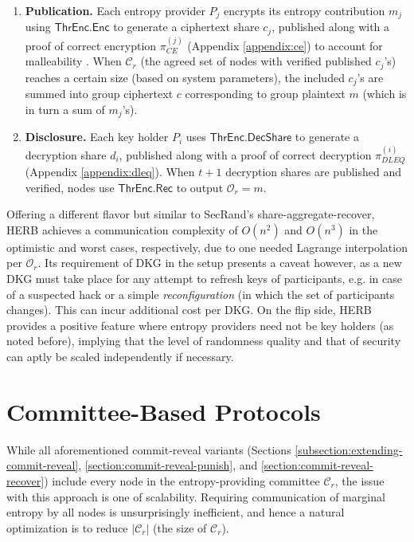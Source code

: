 \documentclass[conference]{IEEEtran}
\theoremstyle{definition}
\theoremstyle{remark}
\begin{document}
\begin{enumerate}
    \item \textbf{Publication.} Each entropy provider $P_j$ encrypts its entropy contribution $m_j$ using $\mathsf{ThrEnc.Enc}$ to generate a ciphertext share $c_j$, published along with a proof of correct encryption $\pi_{CE}^{(j)}$ (Appendix \ref{appendix:ce}) to account for malleability \cite{dolev2003nonmalleable}. When $\mathcal{C}_r$ (the agreed set of nodes with verified published $c_j$'s) reaches a certain size (based on system parameters), the included $c_j$'s are summed into group ciphertext $c$ corresponding to group plaintext $m$ (which is in turn a sum of $m_j$'s).
    \item \textbf{Disclosure.} Each key holder $P_i$ uses $\mathsf{ThrEnc.DecShare}$ to generate a decryption share $d_i$, published along with a proof of correct decryption $\pi_{DLEQ}^{(i)}$ (Appendix \ref{appendix:dleq}). When $t + 1$ decryption shares are published and verified, nodes use $\mathsf{ThrEnc.Rec}$ to output $\mathcal{O}_r = m$.
\end{enumerate}

Offering a different flavor but similar to SecRand's share-aggregate-recover, HERB achieves a communication complexity of $O(n^2)$ and $O(n^3)$ in the optimistic and worst cases, respectively, due to one needed Lagrange interpolation per $\mathcal{O}_r$. Its requirement of DKG in the setup presents a caveat however, as a new DKG must take place for any attempt to refresh keys of participants, e.g. in case of a suspected hack or a simple \textit{reconfiguration} (in which the set of participants changes). This can incur additional cost per DKG. On the flip side, HERB provides a positive feature where entropy providers need not be key holders (as noted before), implying that the level of randomness quality and that of security can aptly be scaled independently if necessary.

\section{Committee-Based Protocols}
\label{section:committee-based}
While all aforementioned commit-reveal variants (Sections \ref{subsection:extending-commit-reveal}, \ref{section:commit-reveal-punish}, and \ref{section:commit-reveal-recover}) include every node in the entropy-providing committee $\mathcal{C}_r$, the issue with this approach is one of scalability. Requiring communication of marginal entropy by all nodes is unsurprisingly inefficient, and hence a natural optimization is to reduce $|\mathcal{C}_r|$ (the size of $\mathcal{C}_r$).
\end{document}
